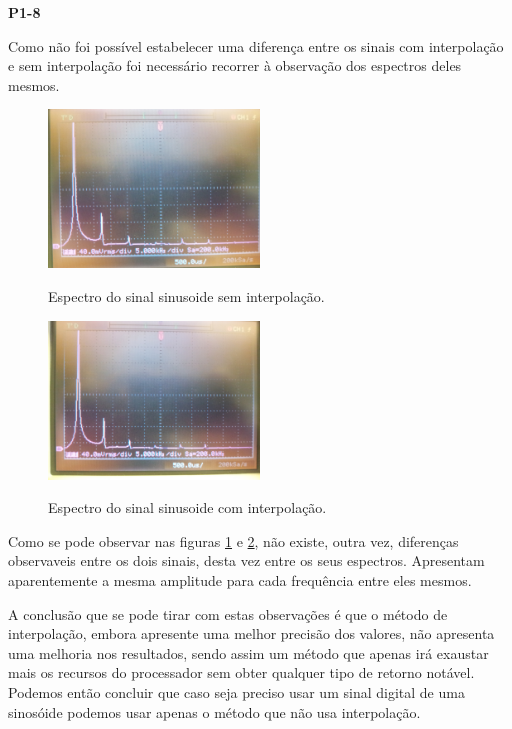 \documentclass[11pt]{article}
\begin{document}
\textbf{P1-8}
\label{para:P1-8}

Como não foi possível estabelecer uma diferença entre os sinais com interpolação e sem interpolação foi necessário recorrer à observação dos espectros deles mesmos.

\begin{figure}[H]
	\centering
	\includegraphics[width=0.5\textwidth]{./P1-8_espect_s_interp}~\\
	\caption{Espectro do sinal sinusoide sem interpolação.}
	\label{fig:espect_s_interp}
\end{figure}

\begin{figure}[H]
	\centering
	\includegraphics[width=0.5\textwidth]{./P1-8_espect_c_interp}~\\
	\caption{Espectro do sinal sinusoide com interpolação.}
	\label{fig:espect_c_interp}
\end{figure}

Como se pode observar nas figuras \ref{fig:espect_s_interp} e \ref{fig:espect_c_interp}, não existe, outra vez, diferenças observaveis entre os dois sinais, desta vez entre os seus espectros. Apresentam aparentemente a mesma amplitude para cada frequência entre eles mesmos.

A conclusão que se pode tirar com estas observações é que o método de interpolação, embora apresente uma melhor precisão dos valores, não apresenta uma melhoria nos resultados, sendo assim um método que apenas irá exaustar mais os recursos do processador sem obter qualquer tipo de retorno notável. Podemos então concluir que caso seja preciso usar um sinal digital de uma sinosóide podemos usar apenas o método que não usa interpolação.
\end{document}

